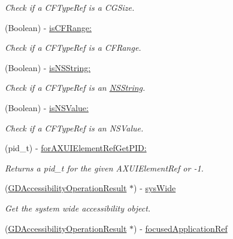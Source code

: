 \begin{DoxyCompactItemize}
\begin{DoxyCompactList}\small\item\em Check if a CFTypeRef is a CGSize. \item\end{DoxyCompactList}\item 
(Boolean) -\/ \hyperlink{interface_g_d_accessibility_manager_ac7682be7c9d421b3b6aff5bd0427c484}{isCFRange:}
\begin{DoxyCompactList}\small\item\em Check if a CFTypeRef is a CFRange. \item\end{DoxyCompactList}\item 
(Boolean) -\/ \hyperlink{interface_g_d_accessibility_manager_a7383e6153121e98d5c0a7b1a01705f50}{isNSString:}
\begin{DoxyCompactList}\small\item\em Check if a CFTypeRef is an \hyperlink{class_n_s_string}{NSString}. \item\end{DoxyCompactList}\item 
(Boolean) -\/ \hyperlink{interface_g_d_accessibility_manager_acdce820e06d533b51a1eaec8618019c1}{isNSValue:}
\begin{DoxyCompactList}\small\item\em Check if a CFTypeRef is an NSValue. \item\end{DoxyCompactList}\item 
(pid\_\-t) -\/ \hyperlink{interface_g_d_accessibility_manager_a77c4e5a6c3c879ba3a1a4d305c2ebd31}{forAXUIElementRefGetPID:}
\begin{DoxyCompactList}\small\item\em Returns a pid\_\-t for the given AXUIElementRef or -\/1. \item\end{DoxyCompactList}\item 
\hypertarget{interface_g_d_accessibility_manager_a401462c73c47443c17a5f9d7ca23dd6e}{
(\hyperlink{interface_g_d_accessibility_operation_result}{GDAccessibilityOperationResult} $\ast$) -\/ \hyperlink{interface_g_d_accessibility_manager_a401462c73c47443c17a5f9d7ca23dd6e}{sysWide}}
\label{interface_g_d_accessibility_manager_a401462c73c47443c17a5f9d7ca23dd6e}

\begin{DoxyCompactList}\small\item\em Get the system wide accessibility object. \item\end{DoxyCompactList}\item 
\hypertarget{interface_g_d_accessibility_manager_a0ab18a6fc517e268a93f5e1b3157fd2a}{
(\hyperlink{interface_g_d_accessibility_operation_result}{GDAccessibilityOperationResult} $\ast$) -\/ \hyperlink{interface_g_d_accessibility_manager_a0ab18a6fc517e268a93f5e1b3157fd2a}{focusedApplicationRef}}
\label{interface_g_d_accessibility_manager_a0ab18a6fc517e268a93f5e1b3157fd2a}


\end{DoxyCompactItemize}
